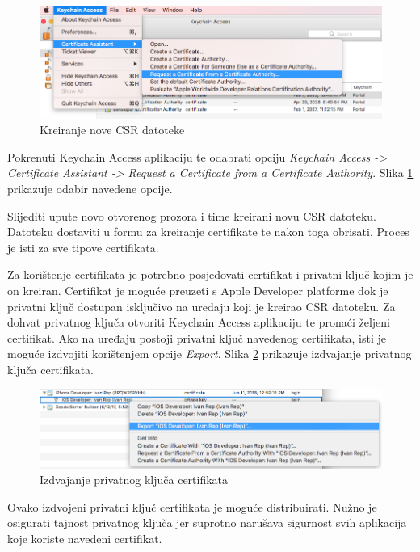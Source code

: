 \documentclass[times, utf8, diplomski, numeric]{fer}
\begin{document}
\begin{appendices}
\begin{figure}
\centering
\includegraphics[scale=0.4]{KeychainAccessRequest}
\caption{Kreiranje nove CSR datoteke}
\label{fig:KeychainAccessRequest}
\end{figure}

Pokrenuti Keychain Access aplikaciju te odabrati opciju \textit{Keychain Access -> Certificate Assistant -> Request a Certificate from a Certificate Authority}. Slika \ref{fig:KeychainAccessRequest} prikazuje odabir navedene opcije.

Slijediti upute novo otvorenog prozora i time kreirani novu CSR datoteku. Datoteku dostaviti u formu za kreiranje certifikate te nakon toga obrisati. Proces je isti za sve tipove certifikata.

Za korištenje certifikata je potrebno posjedovati certifikat i privatni ključ kojim je on kreiran. Certifikat je moguće preuzeti s Apple Developer platforme dok je privatni ključ dostupan isključivo na uređaju koji je kreirao CSR datoteku. Za dohvat privatnog ključa otvoriti Keychain Access aplikaciju te pronaći željeni certifikat. Ako na uređaju postoji privatni ključ navedenog certifikata, isti je moguće izdvojiti korištenjem opcije \textit{Export}. Slika \ref{fig:PrivateKeyExport} prikazuje izdvajanje privatnog ključa certifikata.

\begin{figure}[b!]
\centering
\includegraphics[scale=0.4]{PrivateKeyExport}
\caption{Izdvajanje privatnog ključa certifikata}
\label{fig:PrivateKeyExport}
\end{figure}

Ovako izdvojeni privatni ključ certifikata je moguće distribuirati. Nužno je osigurati tajnost privatnog ključa jer suprotno narušava sigurnost svih aplikacija koje koriste navedeni certifikat.


\end{appendices}
\end{document}
